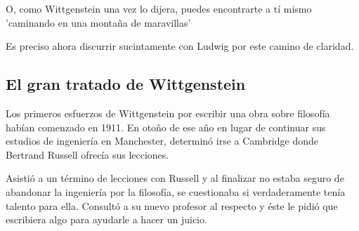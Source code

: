 O, como Wittgenstein una vez lo dijera, puedes encontrarte a tí mismo 'caminando
en una montaña de maravillas'




Es preciso ahora discurrir sucintamente con Ludwig por este camino de
claridad.

\subsection{El gran tratado de Wittgenstein}


Los primeros esfuerzos de Wittgenstein por escribir una obra sobre filosofía
habían comenzado en 1911. En otoño de ese año en lugar de continuar sus estudios
de ingeniería en Manchester, determinó irse a Cambridge donde Bertrand Russell
ofrecía sus lecciones.

Asistió a un término de lecciones con Russell y al finalizar no estaba seguro de
abandonar la ingeniería por la filosofía, se cuestionaba si verdaderamente tenía
talento para ella. Consultó a su nuevo profesor al respecto y éste le pidió que
escribiera algo para ayudarle a hacer un juicio.

